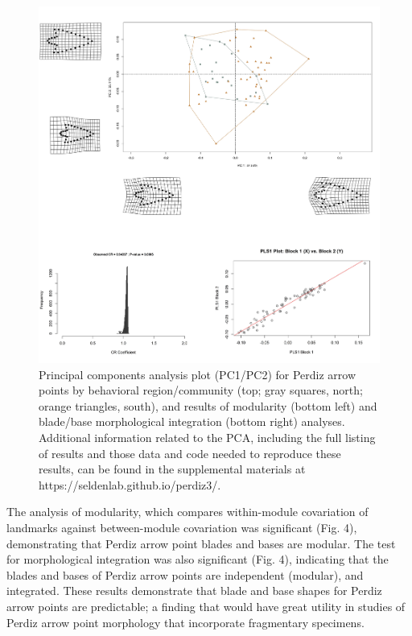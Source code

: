 \documentclass[smallextended]{svjour3}       %
\begin{document}
\begin{figure}
\includegraphics[width=1\linewidth]{ms-figs/figure4} \caption{Principal components analysis plot (PC1/PC2) for Perdiz arrow points by behavioral region/community (top; gray squares, north; orange triangles, south), and results of modularity (bottom left) and blade/base morphological integration (bottom right) analyses. Additional information related to the PCA, including the full listing of results and those data and code needed to reproduce these results, can be found in the supplemental materials at https://seldenlab.github.io/perdiz3/.}\label{fig:fig4}
\end{figure}

The analysis of modularity, which compares within-module covariation of
landmarks against between-module covariation was significant (Fig. 4),
demonstrating that Perdiz arrow point blades and bases are modular. The
test for morphological integration was also significant (Fig. 4),
indicating that the blades and bases of Perdiz arrow points are
independent (modular), and integrated. These results demonstrate that
blade and base shapes for Perdiz arrow points are predictable; a finding
that would have great utility in studies of Perdiz arrow point
morphology that incorporate fragmentary specimens.
\end{document}

